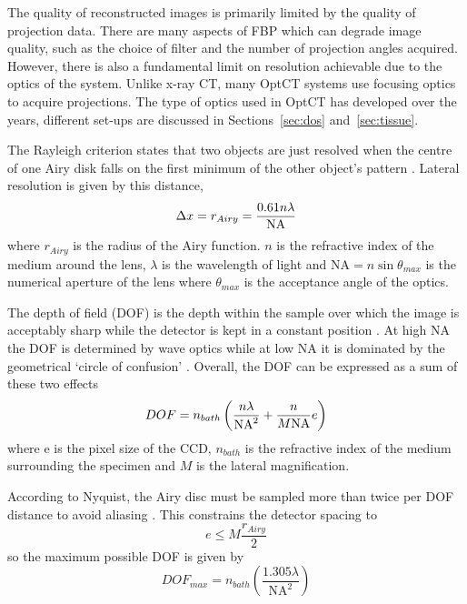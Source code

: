 The quality of reconstructed images is primarily limited by the quality of projection data. There are many aspects of FBP which can degrade image quality, such as the choice of filter and the number of projection angles acquired. However, there is also a fundamental limit on resolution achievable due to the optics of the system. Unlike x-ray CT, many OptCT systems use focusing optics to acquire projections. The type of optics used in OptCT has developed over the years, different set-ups are discussed in Sections~\ref{sec:dos} and~\ref{sec:tissue}. 

The Rayleigh criterion states that two objects are just resolved when the centre of one Airy disk falls on the first minimum of the other object's pattern \cite{hecht2002optics}.
Lateral resolution is given by this distance,
\begin{equation}
\Delta x=r_{Airy} = \dfrac{0.61n\lambda}{\rm{NA}}
\label{eq:res}
\end{equation}
where $r_{Airy}$ is the radius of the Airy function. $n$ is the refractive index of the medium around the lens, $\lambda$ is the wavelength of light and NA$=n\sin \theta_{max}$ is the numerical aperture of the lens where $\theta_{max}$ is the acceptance angle of the optics.

The depth of field (DOF) is the depth within the sample over which the image is acceptably sharp while the detector is kept in a constant position . At high NA the DOF is determined by wave optics while at low NA it is dominated by the geometrical `circle of confusion' \cite{shinya1997video}. Overall, the DOF can be expressed as a sum of these two effects
\begin{equation}
DOF = n_{bath}\left(\dfrac{n\lambda}{\rm{NA}^{2}} + \dfrac{n}{M\rm{NA}}e\right)
\end{equation}
where e is the pixel size of the CCD, $n_{bath}$ is the refractive index of the medium surrounding the specimen and $M$ is the lateral magnification.

According to Nyquist, the Airy disc must be sampled more than twice per DOF distance to avoid aliasing \cite{Walls:2007jl}. This constrains the detector spacing to
\begin{equation}
e \leq M \dfrac{r_{Airy}}{2}
\end{equation}
so the maximum possible DOF is given by
\begin{equation}
DOF_{max} = n_{bath}\left(\dfrac{1.305\lambda}{\mathrm{NA}^{2}}\right)
\label{eq:DOFmax}
\end{equation}

